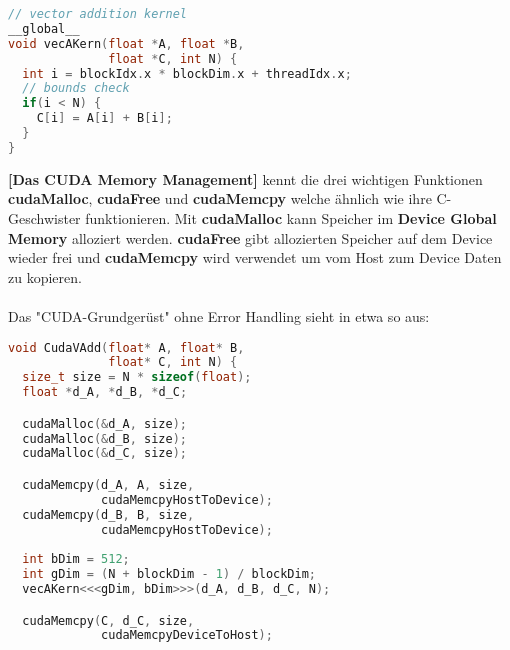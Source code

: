 \documentclass[8pt]{extarticle}
\let\oldtextbf\textbf
\renewcommand{\textbf}{\tiny\oldtextbf}
\begin{document}
\begin{multicols*}{5}
\begin{lstlisting}[language=c]
// vector addition kernel
__global__
void vecAKern(float *A, float *B,
              float *C, int N) {
  int i = blockIdx.x * blockDim.x + threadIdx.x;
  // bounds check
  if(i < N) {
    C[i] = A[i] + B[i];
  }
}
\end{lstlisting}
\textbf{[Das CUDA Memory Management]} kennt die drei wichtigen Funktionen \textbf{cudaMalloc}, \textbf{cudaFree} und \textbf{cudaMemcpy} welche ähnlich wie ihre C-Geschwister funktionieren. Mit \textbf{cudaMalloc} kann Speicher im \textbf{Device Global Memory} alloziert werden. \textbf{cudaFree} gibt allozierten Speicher auf dem Device wieder frei und \textbf{cudaMemcpy} wird verwendet um vom Host zum Device Daten zu kopieren.\\\\
Das "CUDA-Grundgerüst" ohne Error Handling sieht in etwa so aus:
\begin{lstlisting}[language=c]
void CudaVAdd(float* A, float* B,
              float* C, int N) {
  size_t size = N * sizeof(float);
  float *d_A, *d_B, *d_C;

  cudaMalloc(&d_A, size);
  cudaMalloc(&d_B, size);
  cudaMalloc(&d_C, size);

  cudaMemcpy(d_A, A, size,
             cudaMemcpyHostToDevice);
  cudaMemcpy(d_B, B, size,
             cudaMemcpyHostToDevice);
  
  int bDim = 512;
  int gDim = (N + blockDim - 1) / blockDim;
  vecAKern<<<gDim, bDim>>>(d_A, d_B, d_C, N);

  cudaMemcpy(C, d_C, size,
             cudaMemcpyDeviceToHost);


\end{lstlisting}
\end{multicols*}
\end{document}
